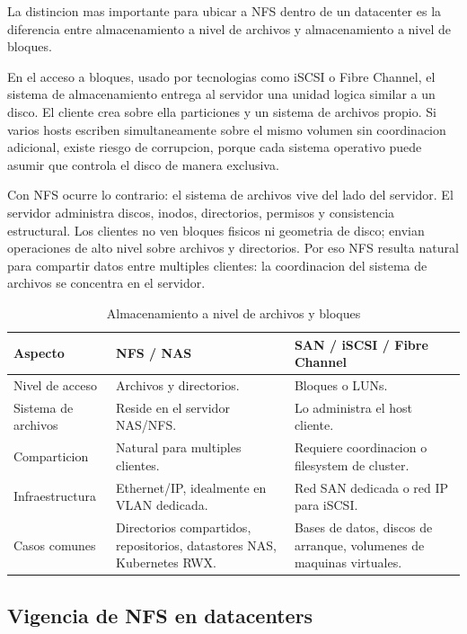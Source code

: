 La distincion mas importante para ubicar a NFS dentro de un datacenter es la diferencia entre almacenamiento a nivel de archivos y almacenamiento a nivel de bloques.

En el acceso a bloques, usado por tecnologias como iSCSI o Fibre Channel, el sistema de almacenamiento entrega al servidor una unidad logica similar a un disco. El cliente crea sobre ella particiones y un sistema de archivos propio. Si varios hosts escriben simultaneamente sobre el mismo volumen sin coordinacion adicional, existe riesgo de corrupcion, porque cada sistema operativo puede asumir que controla el disco de manera exclusiva.

Con NFS ocurre lo contrario: el sistema de archivos vive del lado del servidor. El servidor administra discos, inodos, directorios, permisos y consistencia estructural. Los clientes no ven bloques fisicos ni geometria de disco; envian operaciones de alto nivel sobre archivos y directorios. Por eso NFS resulta natural para compartir datos entre multiples clientes: la coordinacion del sistema de archivos se concentra en el servidor.

\begin{table}[H]
    \centering
    \small
    \renewcommand{\arraystretch}{1.2}
    \begin{tabularx}{\textwidth}{L{3.1cm}YY}
        \toprule
        \textbf{Aspecto} & \textbf{NFS / NAS} & \textbf{SAN / iSCSI / Fibre Channel} \\
        \midrule
        Nivel de acceso & Archivos y directorios. & Bloques o LUNs. \\
        Sistema de archivos & Reside en el servidor NAS/NFS. & Lo administra el host cliente. \\
        Comparticion & Natural para multiples clientes. & Requiere coordinacion o filesystem de cluster. \\
        Infraestructura & Ethernet/IP, idealmente en VLAN dedicada. & Red SAN dedicada o red IP para iSCSI. \\
        Casos comunes & Directorios compartidos, repositorios, datastores NAS, Kubernetes RWX. & Bases de datos, discos de arranque, volumenes de maquinas virtuales. \\
        \bottomrule
    \end{tabularx}
    \caption{Almacenamiento a nivel de archivos y bloques}
    \label{tab:nfs_archivos_bloques}
\end{table}

\subsection{Vigencia de NFS en datacenters}

